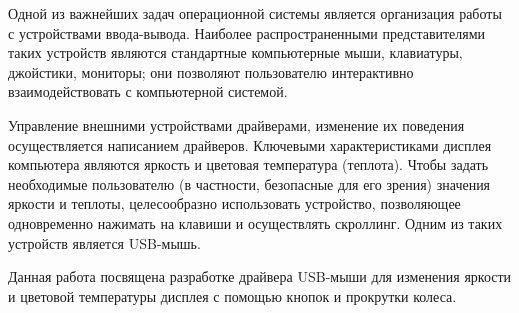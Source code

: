 
Одной из важнейших задач операционной системы является организация работы с устройствами ввода-вывода.
Наиболее распространенными представителями таких устройств являются стандартные компьютерные мыши, клавиатуры, джойстики, мониторы; они позволяют пользователю интерактивно взаимодействовать с компьютерной системой.

Управление внешними устройствами драйверами, изменение их поведения осуществляется написанием драйверов.
Ключевыми характеристиками дисплея компьютера являются яркость и цветовая температура (теплота).
Чтобы задать необходимые пользователю (в частности, безопасные для его зрения) значения яркости и теплоты, целесообразно использовать устройство, позволяющее одновременно нажимать на клавиши и осуществлять скроллинг.
Одним из таких устройств является USB-мышь.

Данная работа посвящена разработке драйвера USB-мыши для изменения яркости и цветовой температуры дисплея с помощью кнопок и прокрутки колеса.
